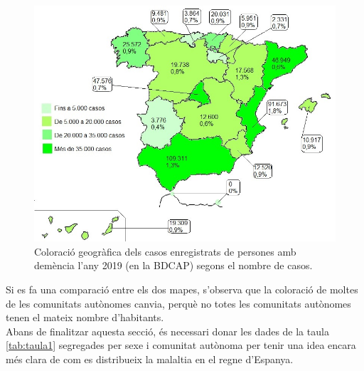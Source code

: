 \documentclass[a4paper,12pt]{article}
\begin{document}
\begin{figure}[H]
    \centering
    \includegraphics[scale = 0.6]{images/distribucio territorial en base a casos.jpg}
    \caption{Coloració geogràfica dels casos enregistrats de persones amb demència l'any 2019 (en la BDCAP) segons el nombre de casos.}
    \label{fig:colorcasos}
\end{figure}
Si es fa una comparació entre els dos mapes, s'observa que la coloració de moltes de les comunitats autònomes canvia, perquè no totes les comunitats autònomes tenen el mateix nombre d'habitants.\\
Abans de finalitzar aquesta secció, és necessari donar les dades de la taula \ref{tab:taula1} segregades per sexe i comunitat autònoma per tenir una idea encara més clara de com es distribueix la malaltia en el regne d'Espanya.
\end{document}
